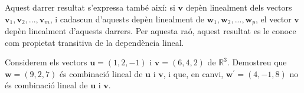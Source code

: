 \begin{observacio}
Aquest darrer resultat s’expressa també així: si $\mathbf{v}$
depèn linealment dels vectors $\mathbf{v}_{1},\mathbf{v}_{2},...,%
\mathbf{v}_{m}$, i cadascun d’aquests depèn linealment de $\mathbf{w}_{1},%
\mathbf{w}_{2},...,\mathbf{w}_{p}$, el vector $\mathbf{v}$ depèn
linealment d’aquests darrers. Per aquesta raó, aquest resultat es le
conoce com propietat transitiva de la dependència lineal.
\end{observacio}

\begin{exemple}
Considerem els vectors $\mathbf{u}=(1,2,-1)$ i $\mathbf{v}=(6,4,2)$ de $%
\mathbb{R}^{3}$. Demostreu que $\mathbf{w}=(9,2,7)$ és combinació
lineal de $\mathbf{u}$ i $\mathbf{v}$, i que, en canvi, $\mathbf{w}^{\prime
}=(4,-1,8)$ no és combinació lineal de $\mathbf{u}$ i $\mathbf{v}$.

\end{exemple}
